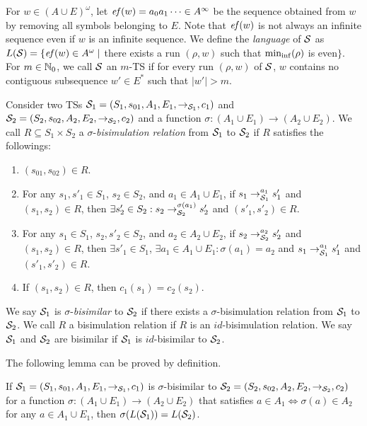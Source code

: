 For $w\in (A\cup E)^\omega$, let
$\mathit{ef}(w) = a_0a_1\cdots\in A^\infty$ be the sequence obtained from $w$ by removing all symbols belonging to $E$.
Note that $\mathit{ef}(w)$ is not always an infinite sequence even if $w$ is an infinite sequence.
We define the \emph{language} of ${\cal S}$ as
$L({\cal S})=\{\mathit{ef}(w)\in A^\omega\mid$
there exists a run $(\rho,w)$ such that ${\rm min_{inf}}(\rho)$ is even$\}$.
For $m\in\mathbb{N}_0$, we call ${\cal S}$ an $m$-TS
if for every run $(\rho,w)$ of ${\cal S}$,
$w$ contains no contiguous subsequence $w'\in E^*$ such that $|w'|> m$.



Consider two TSs
${\cal S}_1=(S_1,s_{01},A_1,E_1,{\to_{{\cal S}_1}},c_1)$ and
${\cal S}_2=(S_2,s_{02},A_2,E_2,{\to_{{\cal S}_2}},\allowbreak c_2)$
and
a function $\sigma:(A_1\cup E_1)\to(A_2\cup E_2)$.
We call $R\subseteq S_1\times S_2$
a $\sigma$-\emph{bisimulation relation} from ${\cal S}_1$ to ${\cal S}_2$
if $R$ satisfies the followings:
\begin{enumerate}[label=(\arabic*)]
\item $(s_{01},s_{02})\in R$.
\item For any $s_1,s'_1\in S_1$, $s_2\in S_2$, and
  $a_1\in A_1\cup E_1$,
  if $s_1\to_{{\cal S}_1}^{a_1} s'_1$ and $(s_1,s_2)\in R$,
  then $\exists s'_2\in S_2: s_2\to_{{\cal S}_2}^{\sigma(a_1)} s'_2$
  and $(s'_1,s'_2)\in R$.
\item For any $s_1\in S_1$, $s_2,s'_2\in S_2$, and
  $a_2\in A_2\cup E_2$,
  if $s_2\to_{{\cal S}_2}^{a_2} s'_2$ and $(s_1,s_2)\in R$,
  then $\exists s'_1\in S_1$, $\exists a_1\in A_1\cup E_1:
  \sigma(a_1)=a_2$ and
  $s_1\to_{{\cal S}_1}^{a_1} s'_1$
  and $(s'_1,s'_2)\in R$.
\item If $(s_1,s_2)\in R$, then $c_1(s_1)=c_2(s_2)$.
\end{enumerate}
%
We say ${\cal S}_1$ is $\sigma$-\emph{bisimilar} to
${\cal S}_2$ if there exists a $\sigma$-bisimulation relation
from ${\cal S}_1$ to ${\cal S}_2$.
%
We call $R$ a bisimulation relation
if $R$ is an $\mathit{id}$-bisimulation relation.
We say ${\cal S}_1$ and ${\cal S}_2$ are bisimilar if
${\cal S}_1$ is $\mathit{id}$-bisimilar to ${\cal S}_2$.

The following lemma can be proved by definition.
\begin{lemma}\label{lemma:bisim-lang}
If
${\cal S}_1=(S_1,s_{01},A_1,E_1,{\to_{{\cal S}_1}},c_1)$ is
$\sigma$-bisimilar to
${\cal S}_2=(S_2,s_{02},A_2,\allowbreak E_2,{\to_{{\cal S}_2}},c_2)$
for
a function $\sigma:(A_1\cup E_1)\to(A_2\cup E_2)$
that satisfies $a\in A_1 \Leftrightarrow \sigma(a)\in A_2$
for any $a\in A_1\cup E_1$,
then
$\sigma(L({\cal S}_1))=L({\cal S}_2)$.
\end{lemma}






